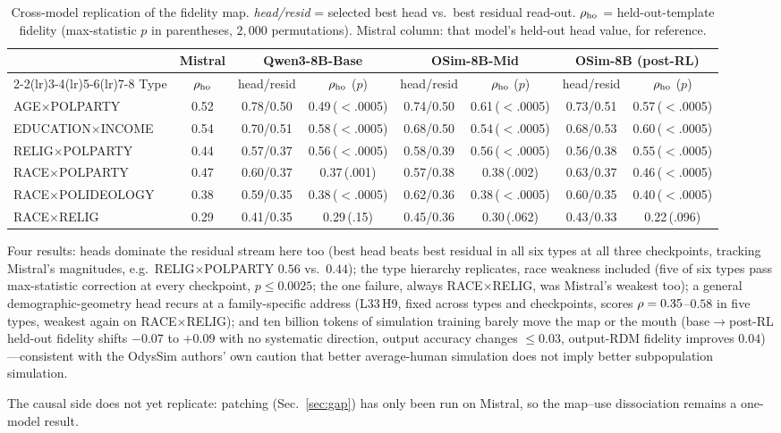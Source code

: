 \begin{table}[t]
\centering\footnotesize
\setlength{\tabcolsep}{3pt}
\caption{Cross-model replication of the fidelity map. \emph{head/resid} =
selected best head vs.\ best residual read-out. $\rho_{\text{ho}}$ =
held-out-template fidelity (max-statistic $p$ in parentheses,
$2{,}000$ permutations). Mistral column: that model's held-out head
value, for reference.}
\label{tab:crossmodel}
\begin{tabular}{lccccccc}
\toprule
& Mistral & \multicolumn{2}{c}{Qwen3-8B-Base}
& \multicolumn{2}{c}{OSim-8B-Mid} & \multicolumn{2}{c}{OSim-8B (post-RL)}\\
\cmidrule(lr){2-2}\cmidrule(lr){3-4}\cmidrule(lr){5-6}\cmidrule(lr){7-8}
Type & $\rho_{\text{ho}}$ & head/resid & $\rho_{\text{ho}}$ ($p$)
& head/resid & $\rho_{\text{ho}}$ ($p$)
& head/resid & $\rho_{\text{ho}}$ ($p$)\\
\midrule
AGE$\times$POLPARTY & 0.52 & 0.78/0.50 & 0.49\,($<$.0005) & 0.74/0.50 & 0.61\,($<$.0005) & 0.73/0.51 & 0.57\,($<$.0005) \\
EDUCATION$\times$INCOME & 0.54 & 0.70/0.51 & 0.58\,($<$.0005) & 0.68/0.50 & 0.54\,($<$.0005) & 0.68/0.53 & 0.60\,($<$.0005) \\
RELIG$\times$POLPARTY & 0.44 & 0.57/0.37 & 0.56\,($<$.0005) & 0.58/0.39 & 0.56\,($<$.0005) & 0.56/0.38 & 0.55\,($<$.0005) \\
RACE$\times$POLPARTY & 0.47 & 0.60/0.37 & 0.37\,(.001) & 0.57/0.38 & 0.38\,(.002) & 0.63/0.37 & 0.46\,($<$.0005) \\
RACE$\times$POLIDEOLOGY & 0.38 & 0.59/0.35 & 0.38\,($<$.0005) & 0.62/0.36 & 0.38\,($<$.0005) & 0.60/0.35 & 0.40\,($<$.0005) \\
RACE$\times$RELIG & 0.29 & 0.41/0.35 & 0.29\,(.15) & 0.45/0.36 & 0.30\,(.062) & 0.43/0.33 & 0.22\,(.096) \\
\bottomrule
\end{tabular}
\end{table}

Four results: heads dominate the residual stream here too (best head
beats best residual in all six types at all three checkpoints, tracking
Mistral's magnitudes, e.g.\ RELIG$\times$POLPARTY $0.56$ vs.\ $0.44$);
the type hierarchy replicates, race weakness included (five of six types
pass max-statistic correction at every checkpoint, $p\le0.0025$; the one
failure, always RACE$\times$RELIG, was Mistral's weakest too); a general
demographic-geometry head recurs at a family-specific address (L33\,H9,
fixed across types and checkpoints, scores $\rho=0.35$--$0.58$ in five
types, weakest again on RACE$\times$RELIG); and ten billion tokens of
simulation training barely move the map or the mouth (base$\to$post-RL
held-out fidelity shifts $-0.07$ to $+0.09$ with no systematic
direction, output accuracy changes $\le0.03$, output-RDM fidelity
improves $0.04$)---consistent with the OdysSim authors' own caution that
better average-human simulation does not imply better subpopulation
simulation.

The causal side does not yet replicate: patching (Sec.~\ref{sec:gap})
has only been run on Mistral, so the map--use dissociation remains a
one-model result.
